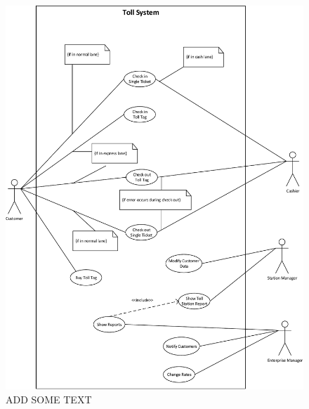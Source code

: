 \begin{figure}
\centering
\includegraphics[width=1\textwidth]{img/use_case_diagram/use_case_diagram}
\caption{ADD SOME TEXT}
\label{fig:use_case_diagram}
\end{figure}
